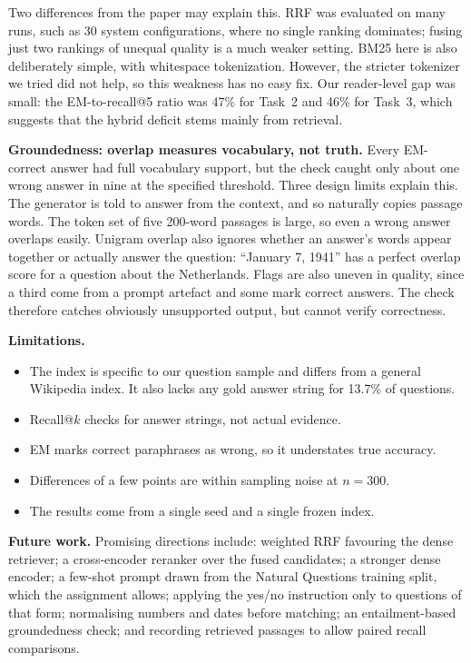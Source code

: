 \documentclass[11pt,a4paper]{article}
\begin{document}
Two differences from the paper may explain this. RRF was evaluated on many runs, such as 30 system configurations, where no single ranking dominates; fusing just two rankings of unequal quality is a much weaker setting. BM25 here is also deliberately simple, with whitespace tokenization. However, the stricter tokenizer we tried did not help, so this weakness has no easy fix. Our reader-level gap was small: the EM-to-recall@5 ratio was 47\% for Task~2 and 46\% for Task~3, which suggests that the hybrid deficit stems mainly from retrieval.

\textbf{Groundedness: overlap measures vocabulary, not truth.} Every EM-correct answer had full vocabulary support, but the check caught only about one wrong answer in nine at the specified threshold. Three design limits explain this. The generator is told to answer from the context, and so naturally copies passage words. The token set of five 200-word passages is large, so even a wrong answer overlaps easily. Unigram overlap also ignores whether an answer's words appear together or actually answer the question: ``January 7, 1941'' has a perfect overlap score for a question about the Netherlands. Flags are also uneven in quality, since a third come from a prompt artefact and some mark correct answers. The check therefore catches obviously unsupported output, but cannot verify correctness.

\textbf{Limitations.}
\begin{itemize}
    \item The index is specific to our question sample and differs from a general Wikipedia index. It also lacks any gold answer string for 13.7\% of questions.
    \item Recall@$k$ checks for answer strings, not actual evidence.
    \item EM marks correct paraphrases as wrong, so it understates true accuracy.
    \item Differences of a few points are within sampling noise at $n=300$.
    \item The results come from a single seed and a single frozen index.
\end{itemize}

\textbf{Future work.} Promising directions include: weighted RRF favouring the dense retriever; a cross-encoder reranker over the fused candidates; a stronger dense encoder; a few-shot prompt drawn from the Natural Questions training split, which the assignment allows; applying the yes/no instruction only to questions of that form; normalising numbers and dates before matching; an entailment-based groundedness check; and recording retrieved passages to allow paired recall comparisons.
\end{document}
